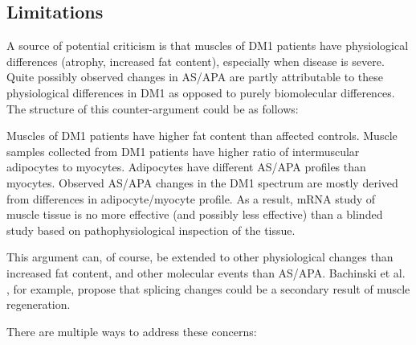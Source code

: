 \documentclass[10pt,letterpaper]{article}
\begin{document}
\begin{table}[!ht]
\begin{adjustwidth}{-2.25in}{0in}
\label{power_table}
\end{adjustwidth}
\end{table}

\subsection*{Limitations} \label{limitations}
A source of potential criticism is that muscles of DM1 patients have physiological differences (atrophy, increased fat content), especially when disease is severe. Quite possibly observed changes in AS/APA are partly attributable to these physiological differences in DM1 as opposed to purely biomolecular differences. The structure of this counter-argument could be as follows:

Muscles of DM1 patients have higher fat content than affected controls.
Muscle samples collected from DM1 patients have higher ratio of intermuscular adipocytes to myocytes.
Adipocytes have different AS/APA profiles than myocytes.
Observed AS/APA changes in the DM1 spectrum are mostly derived from differences in adipocyte/myocyte profile.
As a result, mRNA study of muscle tissue is no more effective (and possibly less effective) than a blinded study based on pathophysiological inspection of the tissue.

This argument can, of course, be extended to other physiological changes than increased fat content, and other molecular events than AS/APA. Bachinski et al. \cite{Bachinski2014}, for example, propose that splicing changes could be a secondary result of muscle regeneration.

There are multiple ways to address these concerns:
\end{document}
